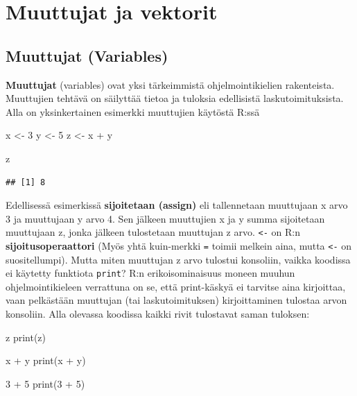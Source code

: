 \documentclass[
]{book}
\newenvironment{Shaded}{\begin{snugshade}}{\end{snugshade}}
\newcommand{\DecValTok}[1]{\textcolor[rgb]{0.00,0.00,0.81}{#1}}
\newcommand{\FunctionTok}[1]{\textcolor[rgb]{0.00,0.00,0.00}{#1}}
\newcommand{\NormalTok}[1]{#1}
\newcommand{\OtherTok}[1]{\textcolor[rgb]{0.56,0.35,0.01}{#1}}
\newcommand{\SpecialCharTok}[1]{\textcolor[rgb]{0.00,0.00,0.00}{#1}}
\begin{document}
\hypertarget{variables_and_vectors}{%
\chapter{Muuttujat ja vektorit}\label{variables_and_vectors}}

\hypertarget{muuttujat-variables}{%
\section{Muuttujat (Variables)}\label{muuttujat-variables}}

\textbf{Muuttujat} (variables) ovat yksi tärkeimmistä ohjelmointikielien rakenteista. Muuttujien tehtävä on säilyttää tietoa ja tuloksia edellisistä laskutoimituksista. Alla on yksinkertainen esimerkki muuttujien käytöstä R:ssä

\begin{Shaded}
\begin{Highlighting}[]
\NormalTok{x }\OtherTok{\textless{}{-}} \DecValTok{3}
\NormalTok{y }\OtherTok{\textless{}{-}} \DecValTok{5}
\NormalTok{z }\OtherTok{\textless{}{-}}\NormalTok{ x }\SpecialCharTok{+}\NormalTok{ y}

\NormalTok{z}
\end{Highlighting}
\end{Shaded}

\begin{verbatim}
## [1] 8
\end{verbatim}

Edellisessä esimerkissä \textbf{sijoitetaan (assign)} eli tallennetaan muuttujaan x arvo 3 ja muuttujaan y arvo 4. Sen jälkeen muuttujien x ja y summa sijoitetaan muuttujaan z, jonka jälkeen tulostetaan muuttujan z arvo.
\texttt{\textless{}-} on R:n \textbf{sijoitusoperaattori} (Myös yhtä kuin-merkki \texttt{=} toimii melkein aina, mutta \texttt{\textless{}-} on suositellumpi).
Mutta miten muuttujan z arvo tulostui konsoliin, vaikka koodissa ei käytetty funktiota \texttt{print}? R:n erikoisominaisuus moneen muuhun ohjelmointikieleen verrattuna on se, että print-käskyä ei tarvitse aina kirjoittaa, vaan pelkästään muuttujan (tai laskutoimituksen) kirjoittaminen tulostaa arvon konsoliin. Alla olevassa koodissa kaikki rivit tulostavat saman tuloksen:

\begin{Shaded}
\begin{Highlighting}[]
\NormalTok{z}
\FunctionTok{print}\NormalTok{(z)}

\NormalTok{x }\SpecialCharTok{+}\NormalTok{ y}
\FunctionTok{print}\NormalTok{(x }\SpecialCharTok{+}\NormalTok{ y)}

\DecValTok{3} \SpecialCharTok{+} \DecValTok{5}
\FunctionTok{print}\NormalTok{(}\DecValTok{3} \SpecialCharTok{+} \DecValTok{5}\NormalTok{)}
\end{Highlighting}
\end{Shaded}
\end{document}
